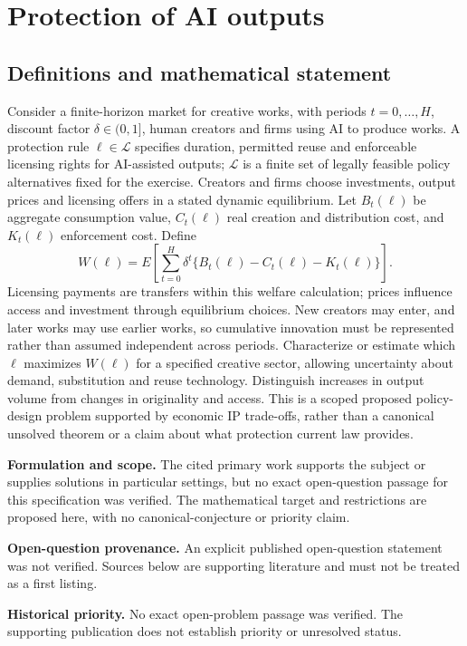 \documentclass[11pt]{article}
\begin{document}
\section*{Protection of AI outputs}\label{30007698}
\subsection{Definitions and mathematical statement}
Consider a finite-horizon market for creative works, with periods \(t=0,\ldots,H\), discount factor \(\delta\in(0,1]\), human creators and firms using AI to produce works. A protection rule \(\ell\in\mathcal L\) specifies duration, permitted reuse and enforceable licensing rights for AI-assisted outputs; \(\mathcal L\) is a finite set of legally feasible policy alternatives fixed for the exercise. Creators and firms choose investments, output prices and licensing offers in a stated dynamic equilibrium. Let \(B_t(\ell)\) be aggregate consumption value, \(C_t(\ell)\) real creation and distribution cost, and \(K_t(\ell)\) enforcement cost. Define
\[
W(\ell)=E\!\left[\sum_{t=0}^{H}\delta^t\{B_t(\ell)-C_t(\ell)-K_t(\ell)\}\right].
\]
Licensing payments are transfers within this welfare calculation; prices influence access and investment through equilibrium choices. New creators may enter, and later works may use earlier works, so cumulative innovation must be represented rather than assumed independent across periods. Characterize or estimate which \(\ell\) maximizes \(W(\ell)\) for a specified creative sector, allowing uncertainty about demand, substitution and reuse technology. Distinguish increases in output volume from changes in originality and access. This is a scoped proposed policy-design problem supported by economic IP trade-offs, rather than a canonical unsolved theorem or a claim about what protection current law provides.

\par\textbf{Formulation and scope.} The cited primary work supports the subject or supplies solutions in particular settings, but no exact open-question passage for this specification was verified. The mathematical target and restrictions are proposed here, with no canonical-conjecture or priority claim.

\par\textbf{Open-question provenance.} An explicit published open-question statement was not verified. Sources below are supporting literature and must not be treated as a first listing.

\par\textbf{Historical priority.} No exact open-problem passage was verified. The supporting publication does not establish priority or unresolved status.
\end{document}
